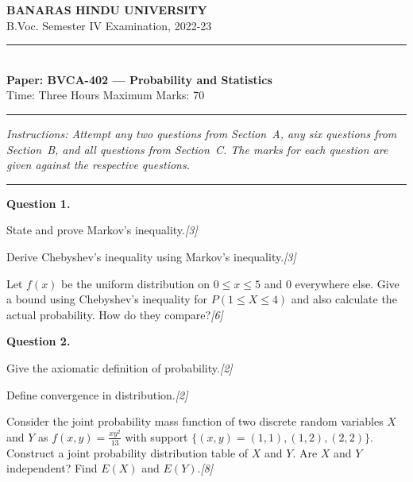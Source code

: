 \documentclass[11pt,a4paper]{article}
\newcommand{\pts}[1]{\hfill   \textit{[#1]}}
\begin{document}
\begin{center}
  {\large\bfseries BANARAS HINDU UNIVERSITY}\\[2pt]
  {
\normalsize B.Voc. Semester IV Examination, 2022-23}\\[6pt]
  \rule{0.8\linewidth}{0.5pt}\\[6pt]
  {\large\bfseries Paper: BVCA-402 --- Probability and Statistics}\\[4pt]
  {
\normalsize Time: Three Hours \hfill Maximum Marks: 70}
\end{center}

\rule{1.0\linewidth}{0.4pt}

\smallskip



\noindent   \textit{Instructions: Attempt any two questions from Section~A, any six questions from Section~B, and all questions from Section~C. The marks for each question are given against the respective questions.}

\bigskip

\bigskip


\rule{\linewidth}{0.4pt}\smallskip

\medskip


\noindent   \textbf{Question 1.}

\begin{parts}
  \item State and prove Markov's inequality.\pts{3}
  \item Derive Chebyshev's inequality using Markov's inequality.\pts{3}
  \item Let $f(x)$ be the uniform distribution on $0 \le x \le 5$ and $0$ everywhere else. Give a bound using Chebyshev's inequality for $P(1 \le X \le 4)$ and also calculate the actual probability. How do they compare?\pts{6}
\end{parts}

\medskip


\noindent   \textbf{Question 2.}

\begin{parts}
  \item Give the axiomatic definition of probability.\pts{2}
  \item Define convergence in distribution.\pts{2}
  \item Consider the joint probability mass function of two discrete random variables $X$ and $Y$ as $f(x, y) = \frac{xy^2}{13}$ with support $\{(x, y) = (1,1), (1, 2), (2, 2)\}$. Construct a joint probability distribution table of $X$ and $Y$. Are $X$ and $Y$ independent? Find $E(X)$ and $E(Y)$.\pts{8}
\end{parts}
\end{document}
